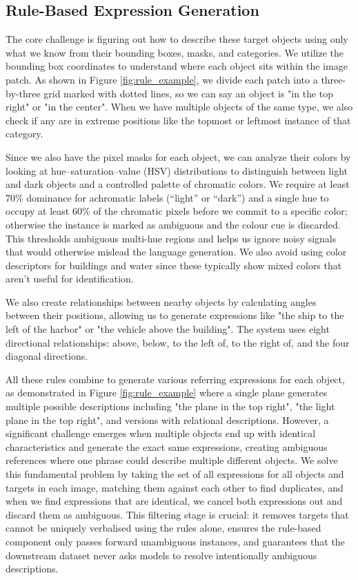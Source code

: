 \subsection{Rule-Based Expression Generation}

The core challenge is figuring out how to describe these target objects using only what we know from their bounding boxes, masks, and categories. We utilize the bounding box coordinates to understand where each object sits within the image patch. As shown in Figure \ref{fig:rule_example}, we divide each patch into a three-by-three grid marked with dotted lines, so we can say an object is "in the top right" or "in the center". When we have multiple objects of the same type, we also check if any are in extreme positions like the topmost or leftmost instance of that category.

Since we also have the pixel masks for each object, we can analyze their colors by looking at hue–saturation–value (HSV) distributions to distinguish between light and dark objects and a controlled palette of chromatic colors. We require at least 70\% dominance for achromatic labels (“light” or “dark”) and a single hue to occupy at least 60\% of the chromatic pixels before we commit to a specific color; otherwise the instance is marked as ambiguous and the colour cue is discarded. This thresholds ambiguous multi-hue regions and helps us ignore noisy signals that would otherwise mislead the language generation. We also avoid using color descriptors for buildings and water since these typically show mixed colors that aren't useful for identification.

We also create relationships between nearby objects by calculating angles between their positions, allowing us to generate expressions like "the ship to the left of the harbor" or "the vehicle above the building". The system uses eight directional relationships: above, below, to the left of, to the right of, and the four diagonal directions.

All these rules combine to generate various referring expressions for each object, as demonstrated in Figure \ref{fig:rule_example} where a single plane generates multiple possible descriptions including "the plane in the top right", "the light plane in the top right", and versions with relational descriptions. However, a significant challenge emerges when multiple objects end up with identical characteristics and generate the exact same expressions, creating ambiguous references where one phrase could describe multiple different objects. We solve this fundamental problem by taking the set of all expressions for all objects and targets in each image, matching them against each other to find duplicates, and when we find expressions that are identical, we cancel both expressions out and discard them as ambiguous. This filtering stage is crucial: it removes targets that cannot be uniquely verbalised using the rules alone, ensures the rule-based component only passes forward unambiguous instances, and guarantees that the downstream dataset never asks models to resolve intentionally ambiguous descriptions.

